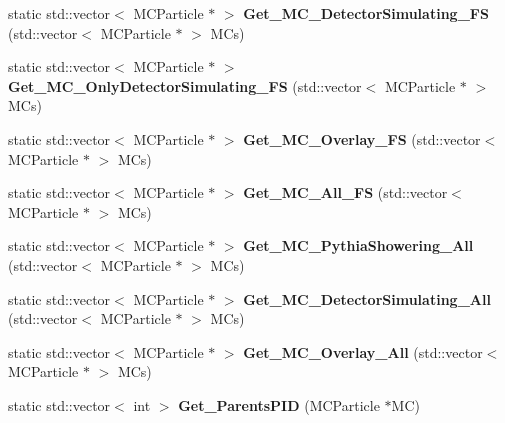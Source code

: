 \begin{DoxyCompactItemize}
\item 
\hypertarget{classToolSet_1_1CMC_af0a81c6e40cc44cecfe9947be99783d4}{
static std::vector$<$ MCParticle $\ast$ $>$ {\bfseries Get\_\-MC\_\-DetectorSimulating\_\-FS} (std::vector$<$ MCParticle $\ast$ $>$ MCs)}
\label{classToolSet_1_1CMC_af0a81c6e40cc44cecfe9947be99783d4}

\item 
\hypertarget{classToolSet_1_1CMC_a766e7761a6db662243c7490a615c380e}{
static std::vector$<$ MCParticle $\ast$ $>$ {\bfseries Get\_\-MC\_\-OnlyDetectorSimulating\_\-FS} (std::vector$<$ MCParticle $\ast$ $>$ MCs)}
\label{classToolSet_1_1CMC_a766e7761a6db662243c7490a615c380e}

\item 
\hypertarget{classToolSet_1_1CMC_a0174dfbf7511f9fa827d9fff33aabc8b}{
static std::vector$<$ MCParticle $\ast$ $>$ {\bfseries Get\_\-MC\_\-Overlay\_\-FS} (std::vector$<$ MCParticle $\ast$ $>$ MCs)}
\label{classToolSet_1_1CMC_a0174dfbf7511f9fa827d9fff33aabc8b}

\item 
\hypertarget{classToolSet_1_1CMC_a826b4fcc4ae58b18ceec544fb5abf563}{
static std::vector$<$ MCParticle $\ast$ $>$ {\bfseries Get\_\-MC\_\-All\_\-FS} (std::vector$<$ MCParticle $\ast$ $>$ MCs)}
\label{classToolSet_1_1CMC_a826b4fcc4ae58b18ceec544fb5abf563}

\item 
\hypertarget{classToolSet_1_1CMC_a96c8f9998df8b19c84b0f45271195ef9}{
static std::vector$<$ MCParticle $\ast$ $>$ {\bfseries Get\_\-MC\_\-PythiaShowering\_\-All} (std::vector$<$ MCParticle $\ast$ $>$ MCs)}
\label{classToolSet_1_1CMC_a96c8f9998df8b19c84b0f45271195ef9}

\item 
\hypertarget{classToolSet_1_1CMC_a8581240b2a8d474e851c3c1ed256fada}{
static std::vector$<$ MCParticle $\ast$ $>$ {\bfseries Get\_\-MC\_\-DetectorSimulating\_\-All} (std::vector$<$ MCParticle $\ast$ $>$ MCs)}
\label{classToolSet_1_1CMC_a8581240b2a8d474e851c3c1ed256fada}

\item 
\hypertarget{classToolSet_1_1CMC_a4bf55a4d64eeec4762f87ee7de91f585}{
static std::vector$<$ MCParticle $\ast$ $>$ {\bfseries Get\_\-MC\_\-Overlay\_\-All} (std::vector$<$ MCParticle $\ast$ $>$ MCs)}
\label{classToolSet_1_1CMC_a4bf55a4d64eeec4762f87ee7de91f585}

\item 
\hypertarget{classToolSet_1_1CMC_aa98186321fc75d5f476bc97511e1d91b}{
static std::vector$<$ int $>$ {\bfseries Get\_\-ParentsPID} (MCParticle $\ast$MC)}
\label{classToolSet_1_1CMC_aa98186321fc75d5f476bc97511e1d91b}


\end{DoxyCompactItemize}
